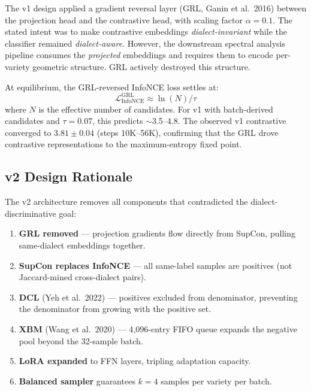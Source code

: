 \documentclass[11pt,a4paper]{article}
\newcommand{\loss}{\mathcal{L}}
\begin{document}
The v1 design applied a gradient reversal layer (GRL, Ganin et al.\ 2016) between the
projection head and the contrastive head, with scaling factor $\alpha = 0.1$. The
stated intent was to make contrastive embeddings \emph{dialect-invariant} while the
classifier remained \emph{dialect-aware}. However, the downstream spectral analysis
pipeline consumes the \emph{projected} embeddings and requires them to encode
per-variety geometric structure. GRL actively destroyed this structure.

At equilibrium, the GRL-reversed InfoNCE loss settles at:
\begin{equation}
\loss_{\text{InfoNCE}}^{\text{GRL}} \approx \ln(N) / \tau
\end{equation}
where $N$ is the effective number of candidates. For v1 with batch-derived candidates
and $\tau = 0.07$, this predicts $\sim$3.5--4.8. The observed v1 contrastive converged
to $3.81 \pm 0.04$ (steps 10K--56K), confirming that the GRL drove contrastive
representations to the maximum-entropy fixed point.

\subsection{v2 Design Rationale}

The v2 architecture removes all components that contradicted the
dialect-discriminative goal:

\begin{enumerate}[nosep]
  \item \textbf{GRL removed} --- projection gradients flow directly from SupCon,
        pulling same-dialect embeddings together.
  \item \textbf{SupCon replaces InfoNCE} --- all same-label samples are positives
        (not Jaccard-mined cross-dialect pairs).
  \item \textbf{DCL} (Yeh et al.\ 2022) --- positives excluded from denominator,
        preventing the denominator from growing with the positive set.
  \item \textbf{XBM} (Wang et al.\ 2020) --- 4{,}096-entry FIFO queue expands the
        negative pool beyond the 32-sample batch.
  \item \textbf{LoRA expanded} to FFN layers, tripling adaptation capacity.
  \item \textbf{Balanced sampler} guarantees $k\!=\!4$ samples per variety per batch.
\end{enumerate}


\end{document}
